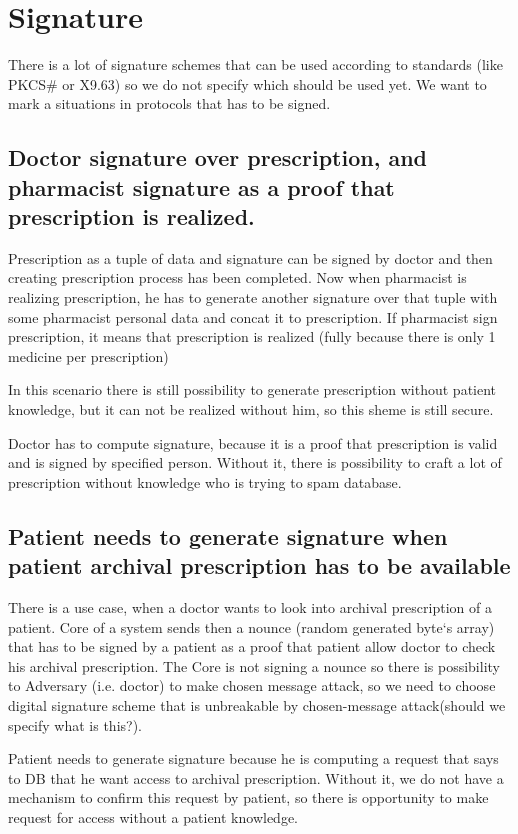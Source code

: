 \section{Signature}

There is a lot of signature schemes that can be used according to standards (like PKCS\# or X9.63) so we do not specify which should be used yet. We want to mark a situations in protocols that has to be signed.
\subsection{Doctor signature over prescription, and pharmacist signature as a proof that prescription is realized.
}
Prescription as a tuple of data and signature can be signed by doctor and then creating prescription process has been completed. Now when pharmacist is realizing prescription, he has to generate another signature over that tuple with some pharmacist personal data and concat it to prescription. If pharmacist sign prescription, it means that prescription is realized (fully because there is only 1 medicine per prescription)

In this scenario there is still possibility to generate prescription without patient knowledge, but it can not be realized without him, so this sheme is still secure. 

Doctor has to compute signature, because it is a proof that prescription is valid and is signed by specified person. Without it, there is possibility to craft a lot of prescription without knowledge who is trying to spam database.

\subsection{Patient needs to generate signature when patient archival prescription has to be available}

There is a use case, when a doctor wants to look into archival prescription of a patient. Core of a system sends then a nounce (random generated byte`s array) that has to be signed by a patient as a proof that patient allow doctor to check his archival prescription. The Core is not signing a nounce so there is possibility to Adversary (i.e. doctor) to make chosen message attack, so we need to choose digital signature scheme that is unbreakable by chosen-message attack(should we specify what is this?). 

Patient needs to generate signature because he is computing a request that says to DB that he want access to archival prescription. Without it, we do not have a mechanism to confirm this request by patient, so there is opportunity to make request for access without a patient knowledge.

